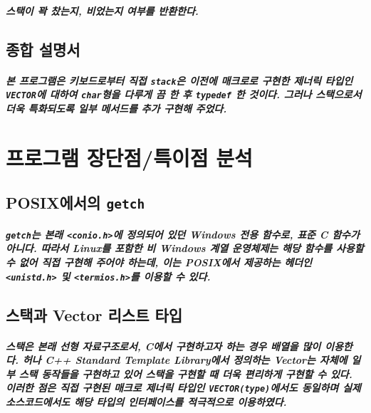 \documentclass[UTF8]{report}
\begin{document}
            \paragraph{%
                \normalfont 스택이 꽉 찼는지, 비었는지 여부를 반환한다.
            }

        \section{종합 설명서}

            \paragraph{%
                \normalfont 본 프로그램은 키보드로부터 직접 \texttt{stack}은 이전에 매크로로 구현한 제너릭 타입인 \texttt{VECTOR}에 대하여 \texttt{char}형을 다루게 끔 한 후 \texttt{typedef} 한 것이다. 그러나 스택으로서 더욱 특화되도록 일부 메서드를 추가 구현해 주었다.
            }

    \chapter{프로그램 장단점/특이점 분석}
            \section{POSIX에서의 \texttt{getch}}
            \paragraph{%
                \normalfont \texttt{getch}는 본래 \texttt{<conio.h>}에 정의되어 있던 Windows 전용 함수로, 표준 C 함수가 아니다. 따라서 Linux를 포함한 비 Windows 계열 운영체제는 해당 함수를 사용할 수 없어 직접 구현해 주어야 하는데, 이는 POSIX에서 제공하는 헤더인 \texttt{<unistd.h>} 및 \texttt{<termios.h>}를 이용할 수 있다.
            }

            \section{스택과 Vector 리스트 타입}
            \paragraph{%
                \normalfont 스택은 본래 선형 자료구조로서, C에서 구현하고자 하는 경우 배열을 많이 이용한다. 허나 C++ Standard Template Library에서 정의하는 Vector는 자체에 일부 스택 동작들을 구현하고 있어 스택을 구현할 때 더욱 편리하게 구현할 수 있다. 이러한 점은 직접 구현된 매크로 제너릭 타입인 \texttt{VECTOR(type)}에서도 동일하며 실제 소스코드에서도 해당 타입의 인터페이스를 적극적으로 이용하였다.
            }
\end{document}
